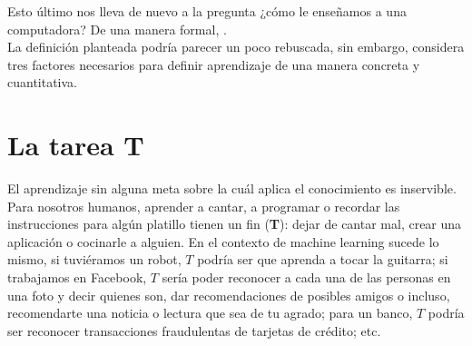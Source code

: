 \documentclass[11pt]{article}
\begin{document}
Esto último nos lleva de nuevo a la pregunta ¿cómo le enseñamos a una computadora? De una manera formal, \cite{Mitchell}. \\


La definición planteada podría parecer un poco rebuscada, sin embargo, considera tres factores necesarios para definir aprendizaje de una manera concreta y cuantitativa.

\section{La tarea \textbf{T}}
El aprendizaje sin alguna meta sobre la cuál aplica el conocimiento es inservible. Para nosotros humanos, aprender a cantar, a programar o recordar las instrucciones para algún platillo tienen un fin (\textbf{T}): dejar de cantar mal, crear una aplicación o cocinarle a alguien. En el contexto de machine learning sucede lo mismo, si tuviéramos un robot, $T$ podría ser que aprenda a tocar la guitarra; si trabajamos en Facebook, $T$ sería poder reconocer a cada una de las personas en una foto y decir quienes son, dar recomendaciones de posibles amigos o incluso, recomendarte una noticia o lectura que sea de tu agrado; para un banco, $T$ podría ser reconocer transacciones fraudulentas de tarjetas de crédito; etc.\\
\end{document}
